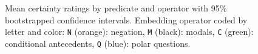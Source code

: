 \documentclass[12pt, a4paper]{article}
\begin{document}
{\begin{figure}[h]
	\vspace{-.5\baselineskip}
	\centering
	\vspace{-1.8\baselineskip}
	\caption{\small Mean certainty ratings by predicate and operator with 95\% bootstrapped confidence intervals. Embedding operator coded by letter and color:  \texttt{N} (orange): negation, \texttt{M} (black): modals, \texttt{C} (green): conditional antecedents, \texttt{Q} (blue): polar questions.}
	\label{fig:figure1}
\end{figure}

}
\end{document}
